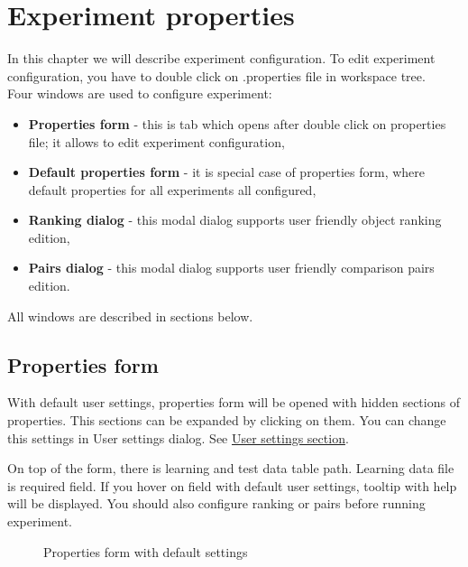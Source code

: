 \section{Experiment properties}\label{section:properties}

In this chapter we will describe experiment configuration. To edit experiment configuration, you have to double click on .properties file in workspace tree.\\

Four windows are used to configure experiment:
\begin{itemize}
	\item \textbf{Properties form} - this is tab which opens after double click on properties file; it allows to edit experiment configuration,
	\item \textbf{Default properties form} - it is special case of properties form, where default properties for all experiments all configured,
	\item \textbf{Ranking dialog} - this modal dialog supports user friendly object ranking edition,
	\item \textbf{Pairs dialog} - this modal dialog supports user friendly comparison pairs edition.
\end{itemize}

All windows are described in sections below.

\subsection{Properties form}\label{sub:properties-form}

With default user settings, properties form will be opened with hidden sections of properties. This sections can be expanded by clicking on them. You can change this settings in User settings dialog. See \hyperref[section:user-settings]{User settings section}.

On top of the form, there is learning and test data table path. Learning data file is required field. If you hover on field with default user settings, tooltip with help will be displayed. You should also configure ranking or pairs before running experiment.

\begin{figure*}[!ht] 
	\centering
	\caption{Properties form with default settings}
\end{figure*}

